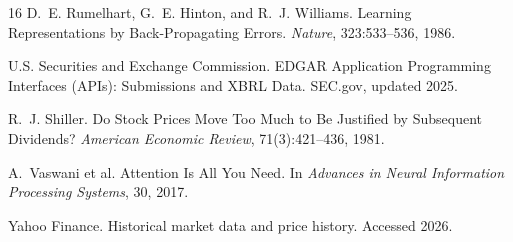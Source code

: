 \documentclass[11pt,twocolumn]{article}
\begin{document}
\begin{thebibliography}{16}
 D.~E. Rumelhart, G.~E. Hinton, and R.~J. Williams.
Learning Representations by Back-Propagating Errors. \textit{Nature},
323:533--536, 1986.

 U.S. Securities and Exchange Commission. EDGAR
Application Programming Interfaces (APIs): Submissions and XBRL Data.
SEC.gov, updated 2025.

 R.~J. Shiller. Do Stock Prices Move Too Much to Be
Justified by Subsequent Dividends? \textit{American Economic Review},
71(3):421--436, 1981.

 A.~Vaswani et al. Attention Is All You Need. In
\textit{Advances in Neural Information Processing Systems}, 30, 2017.

 Yahoo Finance. Historical market data and price
history. Accessed 2026.

\end{thebibliography}
\end{document}
